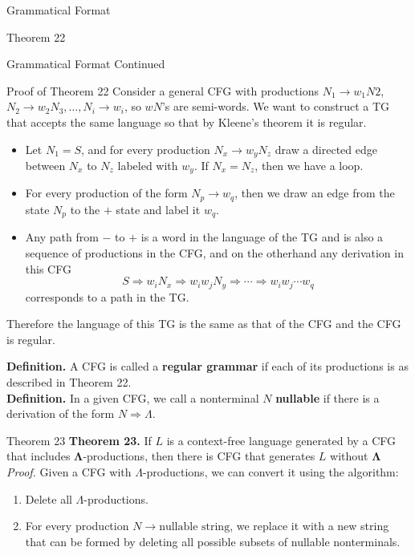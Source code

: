 \documentclass{article}
\begin{document}
\begin{multicols*}{3}
\begin{blackbox}{Grammatical Format}
\begin{redbox}{Theorem 22}
    \end{redbox}
\end{blackbox}
\begin{blackbox}{Grammatical Format Continued}
    \begin{redbox}{Proof of Theorem 22}
        Consider a general CFG with productions $N_1 \rightarrow w_1N2$, $N_2 \rightarrow w_2N_3,\ldots, N_i \rightarrow w_i$, so $wN$'s are semi-words. We want to construct a TG that accepts the same language so that by Kleene's theorem it is regular.
        \begin{itemize}[leftmargin=5pt]
            \item Let $N_1 = S$, and for every production $N_x \rightarrow w_yN_z$ draw a directed edge between $N_x$ to $N_z$ labeled with $w_y$. If $N_x = N_z$, then we have a loop.
            \item For every production of the form $N_p \rightarrow w_q$, then we draw an edge from the state $N_p$ to the $+$ state and label it $w_q$.
            \item Any path from $-$ to $+$ is a word in the language of the TG and is also a sequence of productions in the CFG, and on the otherhand any derivation in this CFG
            \[S \Rightarrow w_iN_x \Rightarrow w_iw_j N_y \Rightarrow \cdots \Rightarrow w_iw_j\cdots w_q\]
            corresponds to a path in the TG.
        \end{itemize} 
        Therefore the language of this TG is the same as that of the CFG and the CFG is regular.
    \end{redbox}
    \textbf{Definition.} A CFG is called a \textbf{regular grammar} if each of its productions is as described in Theorem 22.\\[1ex]
    \textbf{Definition.} In a given CFG, we call a nonterminal $N$ \textbf{nullable} if there is a derivation of the form $N \Rightarrow \Lambda$.\\
    \begin{brownbox}{Theorem 23}
        \textbf{Theorem 23.} If $L$ is a context-free language generated by a CFG that includes $\boldsymbol{\Lambda}$-productions, then there is CFG that generates $L$ without $\boldsymbol{\Lambda}$\\[1ex]
        \textit{Proof.} Given a CFG with $\Lambda$-productions, we can convert it using the algorithm: 
        \begin{enumerate}[leftmargin=7pt]
            \item Delete all $\Lambda$-productions.
            \item For every production $N \rightarrow \text{nullable string}$, we replace it with a new string that can be formed by deleting all possible subsets of nullable nonterminals.

\end{enumerate}
\end{brownbox}
\end{blackbox}
\end{multicols*}
\end{document}
